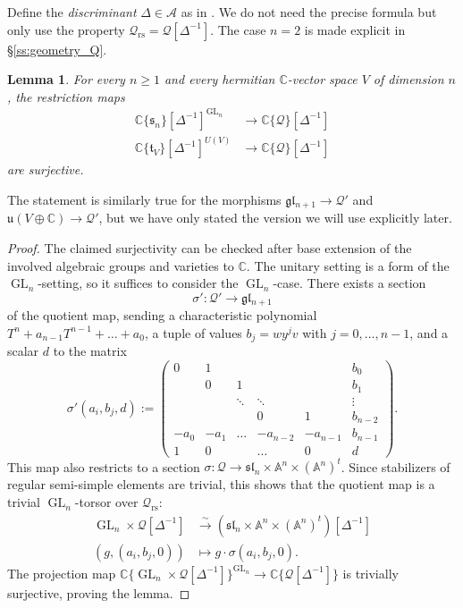 \documentclass[reqno, 11pt]{amsart} %
\numberwithin{equation}{section}
\theoremstyle{plain}
\newtheorem{lemma}[theorem]{Lemma}
\theoremstyle{definition}
\theoremstyle{remark}
\newcommand{\mr}{\mathrm}
\newcommand{\lr}{\longrightarrow}
\newcommand{\mbA}{\mathbb{A}}
\newcommand{\mbC}{\mathbb{C}}
\newcommand{\mcA}{\mathcal{A}}
\newcommand{\mcQ}{\mathcal{Q}}
\newcommand{\mfg}{\mathfrak{g}}
\newcommand{\mfl}{\mathfrak{l}}
\newcommand{\mfs}{\mathfrak{s}}
\newcommand{\mfu}{\mathfrak{u}}
\newcommand{\rs}{\mr{rs}}
\newcommand{\mfgl}{\mfg\mfl}
\newcommand{\mfsl}{\mfs\mfl}
\newcommand{\simlr}{\overset{\sim}{\lr}}
\newcommand{\lie}[1]{ \mathfrak{#1}}
\DeclareMathOperator{\GL}{GL}
\begin{document}
Define the \emph{discriminant} $Δ\in \mcA$ as in \cite[\S4]{Xue}. We do not need the precise formula but only use the property $\mcQ_\rs = \mcQ[Δ^{-1}]$. The case $n = 2$ is made explicit in \S\ref{ss:geometry_Q}.

\begin{lemma}\label{lem:restriction_surjective}
For every $n\geq 1$ and every hermitian $\mbC$-vector space $V$ of dimension $n$, the restriction maps
$$\begin{aligned}
\mbC\{\lie s_n\}[Δ^{-1}]^{\GL_n} & \lr \mbC\{\mcQ\}[Δ^{-1}]\\
\mbC\{ \lie t_V\}[Δ^{-1}]^{U(V)} & \lr \mbC\{\mcQ\}[Δ^{-1}]
\end{aligned}$$
are surjective.
\end{lemma}
The statement is similarly true for the morphisms $\mfgl_{n+1}\to \mcQ'$ and $\mfu(V\oplus \mbC)\to \mcQ'$, but we have only stated the version we will use explicitly later.
\begin{proof}
The claimed surjectivity can be checked after base extension of the involved algebraic groups and varieties to $\mbC$. The unitary setting is a form of the $\GL_n$-setting, so it suffices to consider the $\GL_n$-case. There exists a section
$$σ':\mcQ'\lr \mfgl_{n+1}$$
of the quotient map, sending a characteristic polynomial $T^n + a_{n-1}T^{n-1} + \ldots + a_0$, a tuple of values $b_j = wy^jv$ with $j = 0,\ldots,n-1$, and a scalar $d$ to the matrix
$$σ'(a_i, b_j, d) := \begin{pmatrix}
0& 1& & & & b_0\\
& 0 & 1& & & b_1 \\
& & \ddots& \ddots & & \vdots \\
& & & 0& 1 & b_{n-2}\\
-a_0 & -a_1 & \hdots & -a_{n-2} & -a_{n-1} & b_{n-1}\\
1 & 0 & & \hdots & 0 & d
\end{pmatrix}.$$
This map also restricts to a section $σ:\mcQ \to \mfsl_n\times \mbA^n\times (\mbA^n)^t$. Since stabilizers of regular semi-simple elements are trivial, this shows that the quotient map is a trivial $\GL_n$-torsor over $\mcQ_\rs$:
$$\begin{aligned}
\GL_n \times \mcQ[Δ^{-1}] & \simlr (\mfsl_n\times \mbA^n\times (\mbA^n)^t)[Δ^{-1}]\\[1mm]
(g,(a_i, b_j, 0)) & \longmapsto g\cdot σ(a_i, b_j, 0).
\end{aligned}$$
The projection map $\mbC\{\GL_n\times \mcQ[Δ^{-1}]\}^{\GL_n} \to \mbC\{\mcQ[Δ^{-1}]\}$ is trivially surjective, proving the lemma.
\end{proof}
\end{document}
